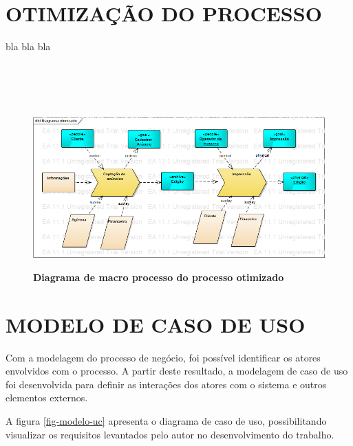 \documentclass[
	12pt,				%
	openright,			%
	oneside,			%
	a4paper,			%
	chapter=TITLE,		%
	section=TITLE,		%
	english,			%
	french,				%
	spanish,			%
	brazil				%
	]{abntex2}
\begin{document}
\section{OTIMIZAÇÃO DO PROCESSO}
bla bla bla \\ \\ \\ \\ \\

\begin{figure}[htb]
	\begin{center}
		\caption{
			\textbf{Diagrama de macro processo do processo otimizado}
		}\label{fig-diag-macroprocesso-otimizado}
		\includegraphics [scale=0.5]{imagens/diagrama_macro_processo_otimizado.png}
		\label{fig-diag-macroprocesso-otimizado}
	\end{center}
\end{figure}

\section{MODELO DE CASO DE USO}
Com a modelagem do processo de negócio, foi possível identificar os atores envolvidos com o processo. A partir deste resultado, a modelagem de caso de uso foi desenvolvida para definir as interações dos atores com o sistema e outros elementos externos.

A figura \ref{fig-modelo-uc} apresenta o diagrama de caso de uso, possibilitando visualizar os requisitos levantados pelo autor no desenvolvimento do trabalho. \\ \\ \\ \\ \\ \\ \\ \\ \\ \\ \\ \\ \\ \\ \\ \\
\end{document}
